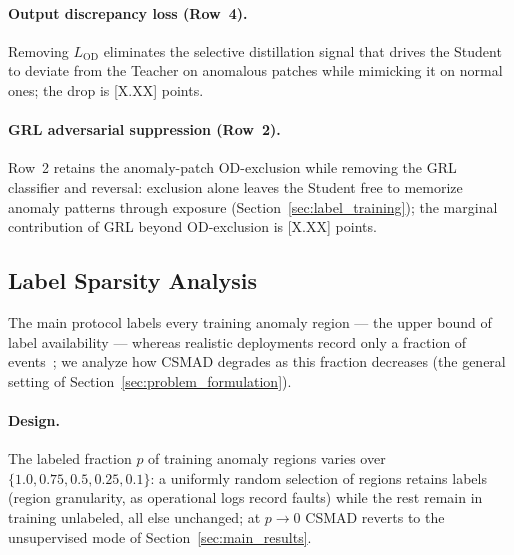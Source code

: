 \paragraph{Output discrepancy loss (Row~4).}
Removing $L_{\mathrm{OD}}$ eliminates the selective distillation signal that drives the Student
to deviate from the Teacher on anomalous patches while mimicking it on normal ones; the drop is
[X.XX] points.

\paragraph{GRL adversarial suppression (Row~2).}
Row~2 retains the anomaly-patch OD-exclusion while removing the GRL classifier and reversal:
exclusion alone leaves the Student free to memorize anomaly patterns through exposure
(Section~\ref{sec:label_training}); the marginal contribution of GRL beyond OD-exclusion is
[X.XX] points.

\subsection{Label Sparsity Analysis}
\label{sec:sparsity}

The main protocol labels every training anomaly region --- the upper bound of label
availability --- whereas realistic deployments record only a fraction of
events~\cite{wang2025nrdetector}; we analyze how CSMAD degrades as this fraction decreases (the
general setting of Section~\ref{sec:problem_formulation}).

\paragraph{Design.}
The labeled fraction $p$ of training anomaly regions varies over
$\{1.0,\allowbreak 0.75,\allowbreak 0.5,\allowbreak 0.25,\allowbreak 0.1\}$: a uniformly random selection of regions retains labels (region
granularity, as operational logs record faults) while the rest remain in training unlabeled,
all else unchanged; at $p \to 0$ CSMAD reverts to the unsupervised mode of
Section~\ref{sec:main_results}.

